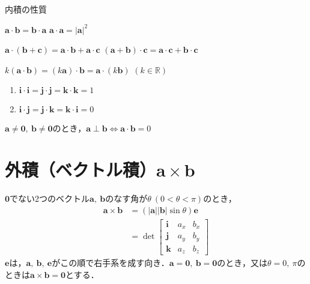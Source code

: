 \begin{kousiki}{内積の性質}
	\begin{enumerate}[label=\textbf{[\arabic*]}, labelsep=10pt, leftmargin=23pt]
		\item $\bm{a} \cdot \bm{b} = \bm{b} \cdot \bm{a}$ \qquad $\bm{a} \cdot \bm{a} = |\bm{a}|^2$
		\item $\bm{a} \cdot (\bm{b} + \bm{c}) = \bm{a} \cdot \bm{b} + \bm{a} \cdot \bm{c}$ \qquad $(\bm{a} + \bm{b}) \cdot \bm{c} = \bm{a} \cdot \bm{c} + \bm{b} \cdot \bm{c}$
		\item $k(\bm{a} \cdot \bm{b}) = (k\bm{a}) \cdot \bm{b} = \bm{a} \cdot (k\bm{b})$ \qquad $(k \in \mathbb{R})$
		\item
			\begin{enumerate}[label=(\roman*), labelsep=10pt, leftmargin=23pt]
				\item $\bm{i} \cdot \bm{i} = \bm{j} \cdot \bm{j} = \bm{k} \cdot \bm{k} = 1$
				\item $\bm{i} \cdot \bm{j} = \bm{j} \cdot \bm{k} = \bm{k} \cdot \bm{i} = 0$
			\end{enumerate}
		\item $\bm{a} \ne \bm{0},\ \bm{b} \ne \bm{0}$のとき，$\bm{a} \perp \bm{b} \iff \bm{a} \cdot \bm{b} = 0$
	\end{enumerate}
	
\end{kousiki}



\section{外積（ベクトル積）\texorpdfstring{$\bm{a} \times \bm{b}$}{AtimesB}}

$\bm{0}$でない2つのベクトル$\bm{a},\ \bm{b}$のなす角が$\theta\ (0 < \theta < \pi)$のとき，
\begin{align}
	\bm{a} \times \bm{b} &= (|\bm{a}||\bm{b}|\sin\theta)\bm{e}\\
	&= \det
	\begin{bmatrix}
		\bm{i} & a_x & b_x\\
		\bm{j} & a_y & b_y\\
		\bm{k} & a_z & b_z
	\end{bmatrix}
\end{align}
$\bm{e}$は，$\bm{a},\ \bm{b},\ \bm{e}$がこの順で右手系を成す向き．$\bm{a} = \bm{0},\ \bm{b} = \bm{0}$のとき，又は$\theta = 0,\ \pi$のときは$\bm{a} \times \bm{b} = \bm{0}$とする．

